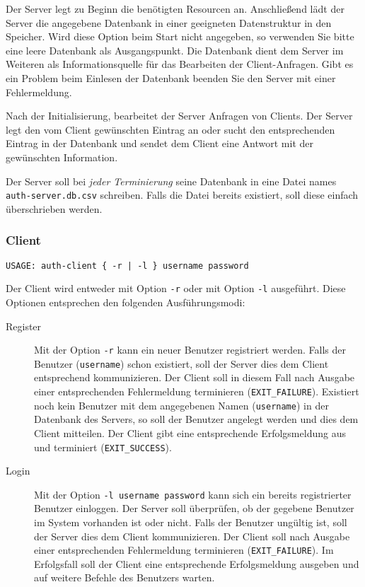 Der Server legt zu Beginn die benötigten Resourcen an. Anschließend lädt der
Server die angegebene Datenbank in einer geeigneten Datenstruktur in den
Speicher. Wird diese Option beim Start nicht angegeben, so verwenden Sie bitte
eine leere Datenbank als Ausgangspunkt. Die Datenbank dient dem Server im
Weiteren als Informationsquelle für das Bearbeiten der Client-Anfragen. Gibt es
ein Problem beim Einlesen der Datenbank beenden Sie den Server mit einer
Fehlermeldung.

Nach der Initialisierung, bearbeitet der Server Anfragen von Clients. Der
Server legt den vom Client gewünschten Eintrag an oder sucht den entsprechenden
Eintrag in der Datenbank und sendet dem Client eine Antwort mit der gewünschten
Information.

Der Server soll bei \textit{jeder Terminierung} seine Datenbank in eine Datei
names \texttt{auth-server.db.csv} schreiben. Falls die Datei bereits existiert,
soll diese einfach überschrieben werden.

\subsubsection*{Client}
\begin{verbatim}
USAGE: auth-client { -r | -l } username password
\end{verbatim}

Der Client wird entweder mit Option \texttt{-r} oder mit Option \texttt{-l}
ausgeführt. Diese Optionen entsprechen den folgenden Ausführungsmodi:

\begin{description}
  \item[Register] Mit der Option \texttt{-r} kann ein neuer Benutzer
    registriert werden. Falls der Benutzer (\texttt{username}) schon existiert,
    soll der Server dies dem Client entsprechend kommunizieren. Der Client soll
    in diesem Fall nach Ausgabe einer entsprechenden Fehlermeldung terminieren
    (\texttt{EXIT\_FAILURE}).  Existiert noch kein Benutzer mit dem angegebenen
    Namen (\texttt{username}) in der Datenbank des Servers, so soll der
    Benutzer angelegt werden und dies dem Client mitteilen. Der Client gibt
    eine entsprechende Erfolgsmeldung aus und terminiert
    (\texttt{EXIT\_SUCCESS}).
  \item[Login] Mit der Option \texttt{-l username password} kann sich ein
    bereits registrierter Benutzer einloggen. Der Server soll überprüfen, ob
    der gegebene Benutzer im System vorhanden ist oder nicht. Falls der
    Benutzer ungültig ist, soll der Server dies dem Client kommunizieren. Der
    Client soll nach Ausgabe einer entsprechenden Fehlermeldung terminieren
    (\texttt{EXIT\_FAILURE}).  Im Erfolgsfall soll der Client eine
    entsprechende Erfolgsmeldung ausgeben und auf weitere Befehle des Benutzers
    warten.
\end{description}

